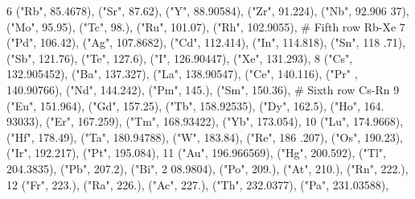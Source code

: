 \begin{DoxyCode}
6                              (\textcolor{stringliteral}{"Rb"}, 85.4678), (\textcolor{stringliteral}{"Sr"}, 87.62), (\textcolor{stringliteral}{"Y"}, 88.90584), (\textcolor{stringliteral}{"Zr"}, 91.224), (\textcolor{stringliteral}{"Nb"}, 92.906
      37), (\textcolor{stringliteral}{"Mo"}, 95.95), (\textcolor{stringliteral}{"Tc"}, 98.), (\textcolor{stringliteral}{"Ru"}, 101.07), (\textcolor{stringliteral}{"Rh"}, 102.9055), \textcolor{comment}{# Fifth row Rb-Xe}
7                              (\textcolor{stringliteral}{"Pd"}, 106.42), (\textcolor{stringliteral}{"Ag"}, 107.8682), (\textcolor{stringliteral}{"Cd"}, 112.414), (\textcolor{stringliteral}{"In"}, 114.818), (\textcolor{stringliteral}{"Sn"}, 118
      .71), (\textcolor{stringliteral}{"Sb"}, 121.76), (\textcolor{stringliteral}{"Te"}, 127.6), (\textcolor{stringliteral}{"I"}, 126.90447), (\textcolor{stringliteral}{"Xe"}, 131.293),
8                              (\textcolor{stringliteral}{"Cs"}, 132.905452), (\textcolor{stringliteral}{"Ba"}, 137.327), (\textcolor{stringliteral}{"La"}, 138.90547), (\textcolor{stringliteral}{"Ce"}, 140.116), (\textcolor{stringliteral}{"Pr"}
      , 140.90766), (\textcolor{stringliteral}{"Nd"}, 144.242), (\textcolor{stringliteral}{"Pm"}, 145.), (\textcolor{stringliteral}{"Sm"}, 150.36), \textcolor{comment}{# Sixth row Cs-Rn}
9                              (\textcolor{stringliteral}{"Eu"}, 151.964), (\textcolor{stringliteral}{"Gd"}, 157.25), (\textcolor{stringliteral}{"Tb"}, 158.92535), (\textcolor{stringliteral}{"Dy"}, 162.5), (\textcolor{stringliteral}{"Ho"}, 164.
      93033), (\textcolor{stringliteral}{"Er"}, 167.259), (\textcolor{stringliteral}{"Tm"}, 168.93422), (\textcolor{stringliteral}{"Yb"}, 173.054),
10                              (\textcolor{stringliteral}{"Lu"}, 174.9668), (\textcolor{stringliteral}{"Hf"}, 178.49), (\textcolor{stringliteral}{"Ta"}, 180.94788), (\textcolor{stringliteral}{"W"}, 183.84), (\textcolor{stringliteral}{"Re"}, 186
      .207), (\textcolor{stringliteral}{"Os"}, 190.23), (\textcolor{stringliteral}{"Ir"}, 192.217), (\textcolor{stringliteral}{"Pt"}, 195.084),
11                              (\textcolor{stringliteral}{"Au"}, 196.966569), (\textcolor{stringliteral}{"Hg"}, 200.592), (\textcolor{stringliteral}{"Tl"}, 204.3835), (\textcolor{stringliteral}{"Pb"}, 207.2), (\textcolor{stringliteral}{"Bi"}, 2
      08.9804), (\textcolor{stringliteral}{"Po"}, 209.), (\textcolor{stringliteral}{"At"}, 210.), (\textcolor{stringliteral}{"Rn"}, 222.),
12                              (\textcolor{stringliteral}{"Fr"}, 223.), (\textcolor{stringliteral}{"Ra"}, 226.), (\textcolor{stringliteral}{"Ac"}, 227.), (\textcolor{stringliteral}{"Th"}, 232.0377), (\textcolor{stringliteral}{"Pa"}, 231.03588),

\end{DoxyCode}
